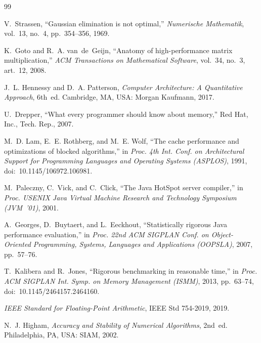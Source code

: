 \documentclass[conference,a4paper]{IEEEtran}
\begin{document}
\begingroup
\renewcommand{\section}[2]{}
\begin{thebibliography}{99}

V.~Strassen, ``Gaussian elimination is not optimal,''
\emph{Numerische Mathematik}, vol.~13, no.~4, pp.~354--356, 1969.

K.~Goto and R.~A. van~de~Geijn, ``Anatomy of high-performance matrix
multiplication,'' \emph{ACM Transactions on Mathematical Software}, vol.~34,
no.~3, art.~12, 2008.

J.~L. Hennessy and D.~A. Patterson, \emph{Computer Architecture: A Quantitative
Approach}, 6th~ed. Cambridge, MA, USA: Morgan Kaufmann, 2017.

U.~Drepper, ``What every programmer should know about memory,'' Red Hat, Inc.,
Tech. Rep., 2007.

M.~D. Lam, E.~E. Rothberg, and M.~E. Wolf, ``The cache performance and
optimizations of blocked algorithms,'' in \emph{Proc. 4th Int. Conf. on
Architectural Support for Programming Languages and Operating Systems
(ASPLOS)}, 1991, doi:~10.1145/106972.106981.

M.~Paleczny, C.~Vick, and C.~Click, ``The Java HotSpot server compiler,'' in
\emph{Proc. USENIX Java Virtual Machine Research and Technology Symposium
(JVM~'01)}, 2001.

A.~Georges, D.~Buytaert, and L.~Eeckhout, ``Statistically rigorous Java
performance evaluation,'' in \emph{Proc. 22nd ACM SIGPLAN Conf. on
Object-Oriented Programming, Systems, Languages and Applications (OOPSLA)},
2007, pp.~57--76.

T.~Kalibera and R.~Jones, ``Rigorous benchmarking in reasonable time,'' in
\emph{Proc. ACM SIGPLAN Int. Symp. on Memory Management (ISMM)}, 2013,
pp.~63--74, doi:~10.1145/2464157.2464160.

\emph{IEEE Standard for Floating-Point Arithmetic}, IEEE Std 754-2019, 2019.

N.~J. Higham, \emph{Accuracy and Stability of Numerical Algorithms}, 2nd~ed.
Philadelphia, PA, USA: SIAM, 2002.

\end{thebibliography}
\endgroup
\end{document}
